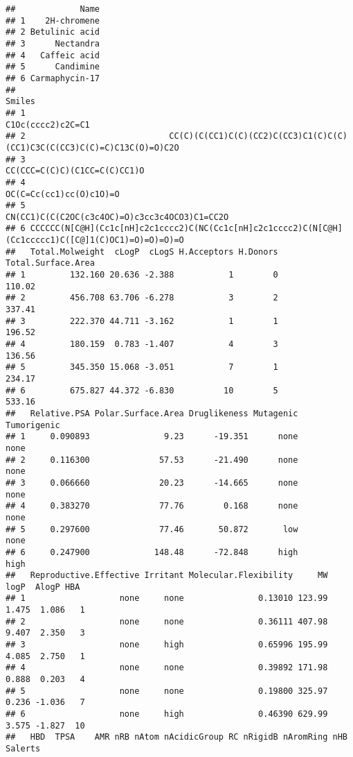 \documentclass[
]{article}
\begin{document}
\begin{verbatim}
##             Name
## 1    2H-chromene
## 2 Betulinic acid
## 3      Nectandra
## 4   Caffeic acid
## 5      Candimine
## 6 Carmaphycin-17
##                                                                                                Smiles
## 1                                                                                   C1Oc(cccc2)c2C=C1
## 2                             CC(C)(C(CC1)C(C)(CC2)C(CC3)C1(C)C(C)(CC1)C3C(C(CC3)C(C)=C)C13C(O)=O)C2O
## 3                                                                        CC(CCC=C(C)C)(C1CC=C(C)CC1)O
## 4                                                                             OC(C=Cc(cc1)cc(O)c1O)=O
## 5                                                       CN(CC1)C(C(C2OC(c3c4OC)=O)c3cc3c4OCO3)C1=CC2O
## 6 CCCCCC(N[C@H](Cc1c[nH]c2c1cccc2)C(NC(Cc1c[nH]c2c1cccc2)C(N[C@H](Cc1ccccc1)C([C@]1(C)OC1)=O)=O)=O)=O
##   Total.Molweight  cLogP  cLogS H.Acceptors H.Donors Total.Surface.Area
## 1         132.160 20.636 -2.388           1        0             110.02
## 2         456.708 63.706 -6.278           3        2             337.41
## 3         222.370 44.711 -3.162           1        1             196.52
## 4         180.159  0.783 -1.407           4        3             136.56
## 5         345.350 15.068 -3.051           7        1             234.17
## 6         675.827 44.372 -6.830          10        5             533.16
##   Relative.PSA Polar.Surface.Area Druglikeness Mutagenic Tumorigenic
## 1     0.090893               9.23      -19.351      none        none
## 2     0.116300              57.53      -21.490      none        none
## 3     0.066660              20.23      -14.665      none        none
## 4     0.383270              77.76        0.168      none        none
## 5     0.297600              77.46       50.872       low        none
## 6     0.247900             148.48      -72.848      high        high
##   Reproductive.Effective Irritant Molecular.Flexibility     MW  logP  AlogP HBA
## 1                   none     none               0.13010 123.99 1.475  1.086   1
## 2                   none     none               0.36111 407.98 9.407  2.350   3
## 3                   none     high               0.65996 195.99 4.085  2.750   1
## 4                   none     none               0.39892 171.98 0.888  0.203   4
## 5                   none     none               0.19800 325.97 0.236 -1.036   7
## 6                   none     high               0.46390 629.99 3.575 -1.827  10
##   HBD  TPSA    AMR nRB nAtom nAcidicGroup RC nRigidB nAromRing nHB Salerts

\end{verbatim}
\end{document}
